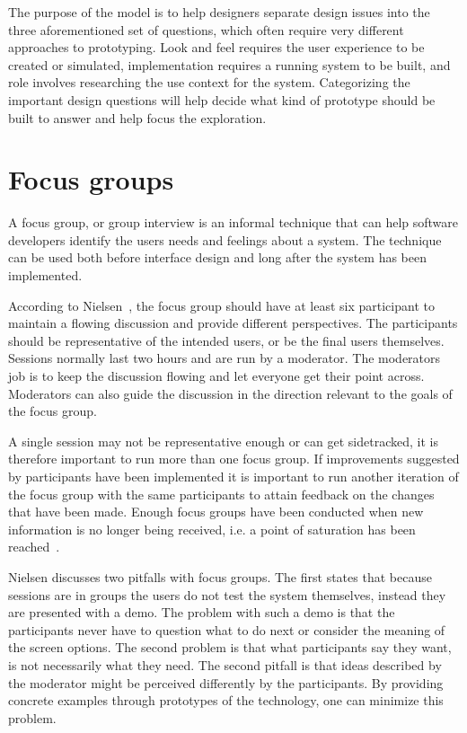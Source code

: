 The purpose of the model is to help designers separate design issues into the three aforementioned set of questions, which often require very different approaches to prototyping. Look and feel requires the user experience to be created or simulated, implementation requires a running system to be built, and role involves researching the use context for the system. Categorizing the important design questions will help decide what kind of prototype should be built to answer and help focus the exploration.

\section{Focus groups}
\label{sec:focusGroup}
A focus group, or group interview is an informal technique that can help software developers identify the users needs and feelings about a system. The technique can be used both before interface design and long after the system has been implemented. 

According to Nielsen~\cite{focusGroup}, the focus group should have at least six participant to maintain a flowing discussion and provide different perspectives. The participants should be representative of the intended users, or be the final users themselves. Sessions normally last two hours and are run by a moderator. The moderators job is to keep the discussion flowing and let everyone get their point across. Moderators can also guide the discussion in the direction relevant to the goals of the focus group. 

A single session may not be representative enough or can get sidetracked, it is therefore important to run more than one focus group. If improvements suggested by participants have been implemented it is important to run another iteration of the focus group with the same participants to attain feedback on the changes that have been made. Enough focus groups have been conducted when new information is no longer being received, i.e. a point of saturation has been reached~\cite{howFocusGroup}. 

Nielsen discusses two pitfalls with focus groups. The first states that because sessions are in groups the users do not test the system themselves, instead they are presented with a demo. The problem with such a demo is that the participants never have to question what to do next or consider the meaning of the screen options. The second problem is that what participants say they want, is not necessarily what they need. The second pitfall is that ideas described by the moderator might be perceived differently by the participants. By providing concrete examples through prototypes of the technology, one can minimize this problem.

